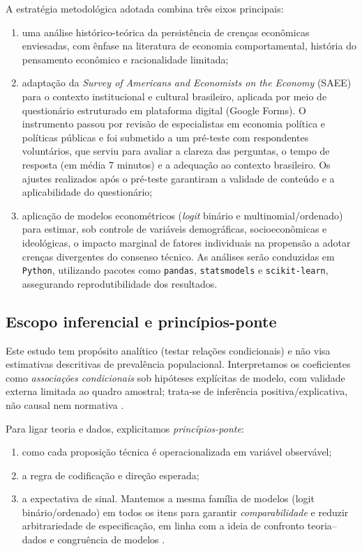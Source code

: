 A estratégia metodológica adotada combina três eixos principais:
\begin{enumerate}[label=\alph*)]
    \item uma análise histórico-teórica da persistência de crenças econômicas enviesadas, com ênfase na literatura de economia comportamental, história do pensamento econômico e racionalidade limitada;
    \item adaptação da \textit{Survey of Americans and Economists on the Economy} (SAEE) para o contexto institucional e cultural brasileiro, aplicada por meio de questionário estruturado em plataforma digital (Google Forms). O instrumento passou por revisão de especialistas em economia política e políticas públicas e foi submetido a um pré-teste com respondentes voluntários, que serviu para avaliar a clareza das perguntas, o tempo de resposta (em média 7 minutos) e a adequação ao contexto brasileiro. Os ajustes realizados após o pré-teste garantiram a validade de conteúdo e a aplicabilidade do questionário;
    \item aplicação de modelos econométricos (\textit{logit} binário e multinomial/ordenado) para estimar, sob controle de variáveis demográficas, socioeconômicas e ideológicas, o impacto marginal de fatores individuais na propensão a adotar crenças divergentes do consenso técnico. As análises serão conduzidas em \texttt{Python}, utilizando pacotes como \texttt{pandas}, \texttt{statsmodels} e \texttt{scikit-learn}, assegurando reprodutibilidade dos resultados.
\end{enumerate}

\subsection{Escopo inferencial e princípios-ponte}

Este estudo tem propósito analítico (testar relações condicionais) e não visa estimativas descritivas de prevalência populacional. Interpretamos os coeficientes como \textit{associações condicionais} sob hipóteses explícitas de modelo, com validade externa limitada ao quadro amostral; trata-se de inferência positiva/explicativa, não causal nem normativa \cite{hausman2008}.

Para ligar teoria e dados, explicitamos \textit{princípios-ponte}:

\begin{enumerate}[label=\roman*)]
    \item como cada proposição técnica é operacionalizada em variável observável;
    \item a regra de codificação e direção esperada;
    \item a expectativa de sinal. Mantemos a mesma família de modelos (logit binário/ordenado) em todos os itens para garantir \textit{comparabilidade} e reduzir arbitrariedade de especificação, em linha com a ideia de confronto teoria–dados e congruência de modelos \cite{stigum2003}.
\end{enumerate}

